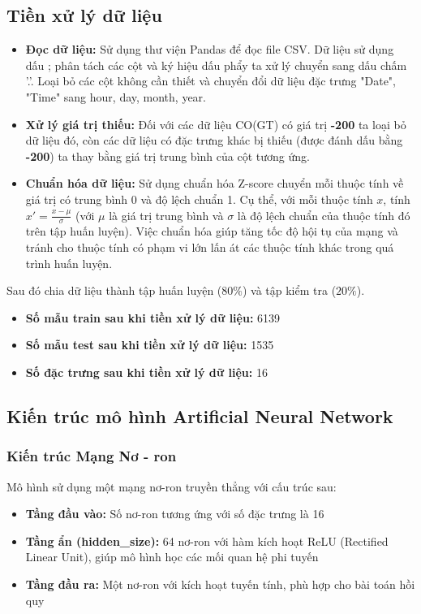 \subsection{Tiền xử lý dữ liệu}
\begin{itemize}
    \item \textbf{Đọc dữ liệu:} Sử dụng thư viện Pandas để đọc file CSV. Dữ liệu sử dụng dấu ; phân tách các cột và ký hiệu dấu phẩy ta xử lý chuyển sang dấu chấm '.'. Loại bỏ các cột không cần thiết và chuyển đổi dữ liệu đặc trưng "Date", "Time" sang hour, day, month, year.
    \item \textbf{Xử lý giá trị thiếu:} Đối với các dữ liệu CO(GT) có giá trị \textbf{-200} ta loại bỏ dữ liệu đó, còn các dữ liệu có đặc trưng khác bị thiếu (được đánh dấu bằng \textbf{-200}) ta thay bằng giá trị trung bình của cột tương ứng.
    \item \textbf{Chuẩn hóa dữ liệu: } Sử dụng chuẩn hóa Z-score chuyển mỗi thuộc tính về giá trị có trung bình 0 và độ lệch chuẩn 1. Cụ thể, với mỗi thuộc tính $x$, tính $x' = \frac{x - \mu}{\sigma}$ (với $\mu$ là giá trị trung bình và $\sigma$ là độ lệch chuẩn của thuộc tính đó trên tập huấn luyện). Việc chuẩn hóa giúp tăng tốc độ hội tụ của mạng và tránh cho thuộc tính có phạm vi lớn lấn át các thuộc tính khác trong quá trình huấn luyện.
\end{itemize}
Sau đó chia dữ liệu thành tập huấn luyện ($80\%$) và tập kiểm tra ($20\%$).

\begin{itemize}
    \item \textbf{Số mẫu train sau khi tiền xử lý dữ liệu:} 6139
    \item \textbf{Số mẫu test sau khi tiền xử lý dữ liệu:} 1535
    \item \textbf{Số đặc trưng sau khi tiền xử lý dữ liệu:} 16
\end{itemize}

\subsection{Kiến trúc mô hình Artificial Neural Network}
\subsubsection{Kiến trúc Mạng Nơ - ron}
Mô hình sử dụng một mạng nơ-ron truyền thẳng với cấu trúc sau:
\begin{itemize}
    \item \textbf{Tầng đầu vào:} Số nơ-ron tương ứng với số đặc trưng là 16
    \item \textbf{Tầng ẩn (hidden\_size):} 64 nơ-ron với hàm kích hoạt ReLU (Rectified Linear Unit), giúp mô hình học các mối quan hệ phi tuyến
    \item \textbf{Tầng đầu ra:} Một nơ-ron với kích hoạt tuyến tính, phù hợp cho bài toán hồi quy
\end{itemize}

